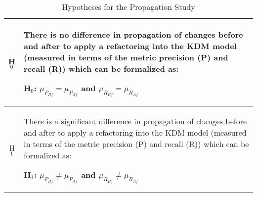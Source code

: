 \begin{table}[h]
\centering
\caption{Hypotheses for the Propagation Study\label{tab:hypotheses}}
~~\\
\begin{tabularx}{
.46\textwidth}{|c|X|}
\hline \cellcolor[gray]{\shadow} H$_0$ & \footnotesize{ There is no difference in propagation of changes before and after to apply a refactoring into the KDM model (measured in terms of the metric precision (P) and recall (R)) which can be formalized as: 

\textbf{H$_{0}$: $\mu_{P_{Bf}} = \mu_{P_{Af}}$ and $\mu_{R_{Bf}} = \mu_{R_{Af}}$}}
\\
\hline \cellcolor[gray]{\shadow} H$_1$ & \footnotesize{There is a significant difference in propagation of changes before and after to apply a refactoring into the KDM model (measured in terms of the metric precision (P) and recall (R)) which can be formalized as:  

\textbf{H$_{1}$: $\mu_{P_{Bf}} \neq \mu_{P_{Af}}$ and $\mu_{R_{Bf}} \neq \mu_{R_{Af}}$}}
\\
\hline
\end{tabularx}
\end{table}







